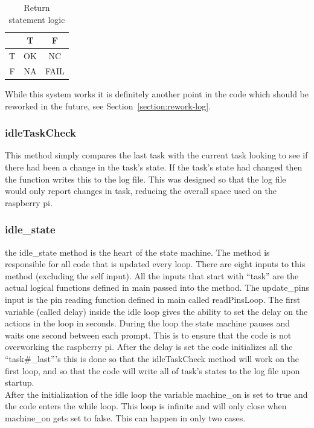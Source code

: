 \documentclass[titlepage]{article}
\begin{document}
\begin{table}[h!]
\centering
    \begin{tabular}{c|c|c}
      & T  & F    \\ \hline
    T & OK & NC   \\ \hline
    F & NA & FAIL 
    \end{tabular}
\caption{Return statement logic}
\label{table:returnl}
\end{table} 


While this system works it is definitely another point in the code which should be reworked in the future, see Section~\ref{section:rework-log}.
\subsubsection{idleTaskCheck}
This method simply compares the last task with the current task looking to see if there had been a change in the task's state. If the task's state had changed then the function writes this to the log file. This was designed so that the log file would only report changes in task, reducing the overall space used on the raspberry pi.

\subsubsection{idle\_state}
the idle\_state method is the heart of the state machine. The method is responsible for all code that is updated every loop. There are eight inputs to this method (excluding the self input). All the inputs that start with ``task'' are the actual logical functions defined in main passed into the method. The update\_pins input is the pin reading function defined in main called readPinsLoop. The first variable (called delay) inside the idle loop gives the ability to set the delay on the actions in the loop in seconds. During the loop the state machine pauses and waits one second between each prompt. This is to ensure that the code is not overworking the raspberry pi. After the delay is set the code initializes all the ``task\#\_last'''s this is done so that the idleTaskCheck method will work on the first loop, and so that the code will write all of task's states to the log file upon startup.\\
After the initialization of the idle loop the variable machine\_on is set to true and the code enters the while loop. This loop is infinite and will only close when machine\_on gets set to false. This can happen in only two cases. \\
\end{document}

